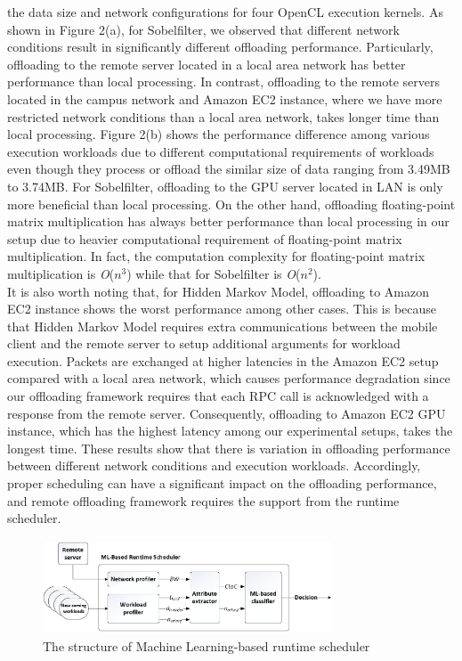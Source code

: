 \documentclass[10pt, conference, compsocconf]{IEEEtran}
\begin{document}
the data size and network configurations for four OpenCL execution
kernels.
%
As shown in Figure 2(a), for Sobelfilter, we observed that different
network conditions result in significantly different offloading
performance.
%
Particularly, offloading to the remote server located in a local area
network has better performance than local processing.
%
In contrast, offloading to the remote servers located in the campus network
and Amazon EC2 instance, where we have more restricted network conditions
than a local area network, takes longer time than local processing. 
%
Figure 2(b) shows the performance difference among various execution
workloads due to different computational requirements of workloads 
even though they process or offload the similar size of data ranging 
from 3.49MB to 3.74MB.
%
For Sobelfilter, offloading to the GPU server located in LAN is only
more beneficial than local processing.
%
On the other hand, offloading floating-point matrix multiplication has
always better performance than local processing in our setup due to
heavier computational requirement of floating-point matrix
multiplication.
%
%
In fact, the computation complexity for floating-point matrix
multiplication is \textit{O}($n^{3}$) while that for Sobelfilter is
\textit{O}($n^{2}$).\\
%
\indent It is also worth noting that, for Hidden Markov Model, offloading to 
Amazon EC2 instance shows the worst performance among other cases.
%
This is because that Hidden Markov Model requires extra communications
between the mobile client and the remote server to setup additional
arguments for workload execution.
%
Packets are exchanged at higher latencies in the Amazon EC2 setup
compared with a local area network, which causes performance degradation
since our offloading framework requires that each RPC call is acknowledged 
with a response from the remote server.
%
Consequently, offloading to Amazon EC2 GPU instance, which has the
highest latency among our experimental setups, takes the longest time.
%
These results show that there is variation in offloading performance
between different network conditions and execution workloads.
%
Accordingly, proper scheduling can have a significant impact on the
offloading performance, and remote offloading framework requires the
support from the runtime scheduler.
%
\begin{figure}
\centering
\includegraphics[height=2.8cm, width=8.6cm]{Figure/figure3}
\caption{The structure of Machine Learning-based runtime scheduler}
\end{figure}
%
\end{document}
